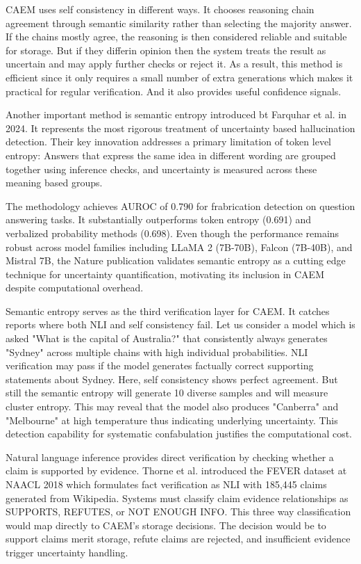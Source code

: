 CAEM uses self consistency in different ways. It chooses reasoning chain agreement through semantic similarity rather than selecting the majority answer. If the chains mostly agree, the reasoning is then considered reliable and suitable for storage. But if they differin opinion then the system treats the result as uncertain and may apply further checks or reject it. As a result, this method is efficient since it only requires a small number of extra generations which makes it practical for regular verification. And it also provides useful confidence signals.

Another important method is semantic entropy introduced bt Farquhar et al. \cite{farquhar2024semantic} in 2024. It represents the most rigorous treatment of uncertainty based hallucination detection. Their key innovation addresses a primary limitation of token level entropy: Answers that express the same idea in different wording are grouped together using inference checks, and uncertainty is measured across these meaning based groups.

The methodology achieves AUROC of 0.790 for frabrication detection on question answering tasks. It substantially outperforms token entropy (0.691) and verbalized probability methods (0.698). Even though the performance remains robust across model families including LLaMA 2 (7B-70B), Falcon (7B-40B), and Mistral 7B, the Nature publication validates semantic entropy as a cutting edge technique for uncertainty quantification, motivating its inclusion in CAEM despite computational overhead.

Semantic entropy serves as the third verification layer for CAEM. It catches reports where both NLI and self consistency fail. Let us consider a model which is asked "What is the capital of Australia?" that consistently always generates "Sydney" across multiple chains with high individual probabilities. NLI verification may pass if the model generates factually correct supporting statements about Sydney. Here, self consistency shows perfect agreement. But still the semantic entropy will generate 10 diverse samples and will measure cluster entropy. This may reveal that the model also produces "Canberra" and "Melbourne" at high temperature thus indicating underlying uncertainty. This detection capability for systematic confabulation justifies the computational cost.

Natural language inference provides direct verification by checking whether a claim is supported by evidence. Thorne et al. \cite{thorne-etal-2018-fever} introduced the FEVER dataset at NAACL 2018 which formulates fact verification as NLI with 185,445 claims generated from Wikipedia. Systems must classify claim evidence relationships as SUPPORTS, REFUTES, or NOT ENOUGH INFO. This three way classification would map directly to CAEM's storage decisions. The decision would be to support claims merit storage, refute claims are rejected, and insufficient evidence trigger uncertainty handling.

